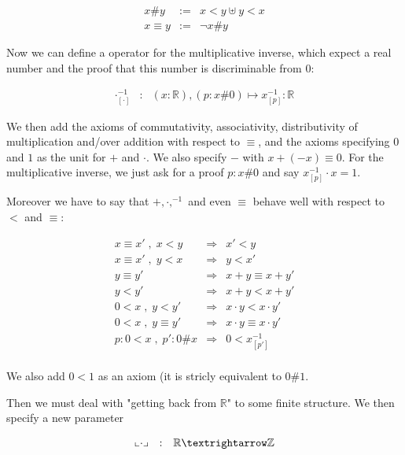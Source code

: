 \documentclass[a4paper,10pt]{article}
\newcommand{\R}{\mathbb{R}}
\newcommand{\Z}{\mathbb{Z}}
\begin{document}
  \[
  \begin{array}{ccl}
  x \# y     & := & x < y \uplus y < x \\
  x \equiv y & := & ¬ x \# y 
  \end{array}
  \]
  
  Now we can define a operator for the multiplicative inverse, which expect a real number and the proof that this number is discriminable from 0:
  
  \[
  \begin{array}{ccl}
  \cdot^{-1}_{[\cdot]} & : & (x:\R), (p:x\#0) \mapsto x^{-1}_{[p]} : \R
  \end{array}
  \]
  
  We then add the axioms of commutativity, associativity, distributivity of multiplication and/over addition with respect to $\equiv$, and the axioms specifying $0$ and $1$ as the unit for $+$ and $\cdot$. We also specify $-$ with $x+(-x)\equiv 0$. For the multiplicative inverse, we just ask for a proof $p:x\#0$ and say $x^{-1}_{[p]}\cdot x=1$.
  
  Moreover we have to say that $+,\cdot,^{-1}$ and even $\equiv$ behave well with respect to $<$ and $\equiv$:
  
  \[
  \begin{array}{rcl}
  x \equiv x' \;,\; x < y   &  \Rightarrow  & x' < y \\
  x \equiv x' \;,\; y < x   &  \Rightarrow  & y < x' \\
  y \equiv y'               &  \Rightarrow  & x + y \equiv x + y' \\
  y < y'                    &  \Rightarrow  & x + y < x + y' \\
  0 < x \;,\; y < y'        &  \Rightarrow  & x \cdot y < x \cdot y' \\
  0 < x \;,\; y \equiv y'   &  \Rightarrow  & x \cdot y \equiv x \cdot y' \\
  p:0<x \;,\;  p':0\#x      &  \Rightarrow  & 0 < x^{-1}_{[p']} \\
  \end{array}
  \]
  
  We also add $0<1$ as an axiom (it is stricly equivalent to $0\#1$.
  
  Then we must deal with "getting back from $\R$" to some finite structure. We then specify a new parameter 
  
  \[
  \begin{array}{rcl}
  \llcorner \cdot \lrcorner &    :          & \R → \Z \\
  \end{array}\\
  \]
  
\end{document}
